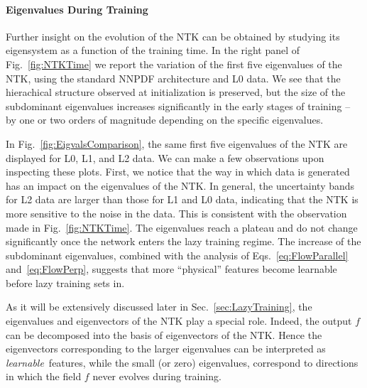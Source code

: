\FloatBarrier

\paragraph{Eigenvalues During Training}

Further insight on the evolution of the NTK can be obtained by studying its
eigensystem as a function of the training time. In the right panel of
Fig.~\ref{fig:NTKTime} we report the variation of the first five
eigenvalues of the NTK, using the standard NNPDF architecture and L0 data. We
see that the hierachical structure observed at initialization is preserved, but
the size of the subdominant eigenvalues increases significantly in the early
stages of training -- by one or two orders of magnitude depending on the
specific eigenvalues. 

In Fig.~\ref{fig:EigvalsComparison}, the same first five eigenvalues of the NTK
are displayed for L0, L1, and L2 data. We can make a few observations upon
inspecting these plots. First, we notice that the way in which data is generated
has an impact on the eigenvalues of the NTK. In general, the uncertainty bands
for L2 data are larger than those for L1 and L0 data, indicating that the NTK is
more sensitive to the noise in the data. This is consistent with the observation
made in Fig.~\ref{fig:NTKTime}. The eigenvalues reach a plateau and do not
change significantly once the network enters the lazy training regime. The
increase of the subdominant eigenvalues, combined with the analysis of
Eqs.~\eqref{eq:FlowParallel} and~\eqref{eq:FlowPerp}, suggests that more
``physical'' features become learnable before lazy training sets in.

As it will be extensively discussed later in Sec.~\ref{sec:LazyTraining}, the
eigenvalues and eigenvectors of the NTK play a special role. Indeed, the output
$f$ can be decomposed into the basis of eigenvectors of the NTK. Hence the
eigenvectors corresponding to the larger eigenvalues can be interpreted as {\em
learnable}\ features, while the small (or zero) eigenvalues, correspond to
directions in which the field $f$ never evolves during training.

